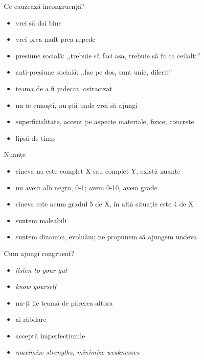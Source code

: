 \documentclass{simple}
\begin{document}
\begin{frame}{Ce cauzează incongruență?}
  \begin{itemize}
    \pause
    \item vrei să dai bine
    \pause
    \item vrei prea mult prea repede
    \pause
    \item presiune socială: ,,trebuie să faci așa, trebuie să fii ca ceilalți''
    \pause
    \item anti-presiune socială: ,,fac pe dos, sunt unic, diferit''
    \pause
    \item teama de a fi judecat, ostracizat
    \pause
    \item nu te cunoști, nu știi unde vrei să ajungi
    \pause
    \item superficialitate, accent pe aspecte materiale, fizice, concrete
    \pause
    \item lipsă de timp
  \end{itemize}
\end{frame}

\begin{frame}{Nuanțe}
  \begin{itemize}
    \pause
    \item cineva nu este complet X sau complet Y, există nuanțe
    \item nu avem alb negru, 0-1; avem 0-10, avem grade
    \item cineva este acum gradul 5 de X, în altă situație este 4 de X
    \pause
    \item suntem maleabili
    \item suntem dinamici, evoluăm; ne propunem să ajungem undeva
  \end{itemize}
\end{frame}

\begin{frame}{Cum ajungi congruent?}
  \begin{itemize}
    \pause
    \item \textit{listen to your gut}
    \pause
    \item \textit{know yourself}
    \pause
    \item nu-ți fie teamă de părerea altora
    \pause
    \item ai răbdare
    \pause
    \item acceptă imperfecțiunile
    \pause
    \item \textit{maximize strengths, minimize weaknesses}
  \end{itemize}
\end{frame}
\end{document}
